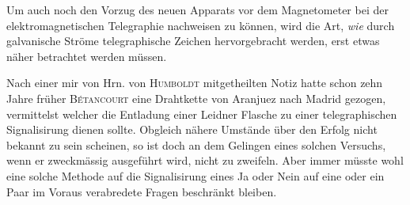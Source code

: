Um auch noch den Vorzug des neuen Apparats vor dem Magnetometer bei der elektromagnetischen Telegraphie nachweisen zu können, wird die Art, \textit{wie} durch galvanische Ströme telegraphische Zeichen hervorgebracht werden, erst etwas näher betrachtet werden müssen.

\expandafter\def\csname HistoricalNoteText375\endcsname{Nach einer mir von Hrn. von \textsc{Humboldt} mitgetheilten Notiz hatte schon zehn Jahre früher \textsc{Bétancourt} eine Drahtkette von Aranjuez nach Madrid gezogen, vermittelst welcher die Entladung einer Leidner Flasche zu einer telegraphischen Signalisirung dienen sollte. Obgleich nähere Umstände über den Erfolg nicht bekannt zu sein scheinen, so ist doch an dem Gelingen eines solchen Versuchs, wenn er zweckmässig ausgeführt wird, nicht zu zweifeln. Aber immer müsste wohl eine solche Methode auf die Signalisirung eines Ja oder Nein auf eine oder ein Paar im Voraus verabredete Fragen beschränkt bleiben.}
